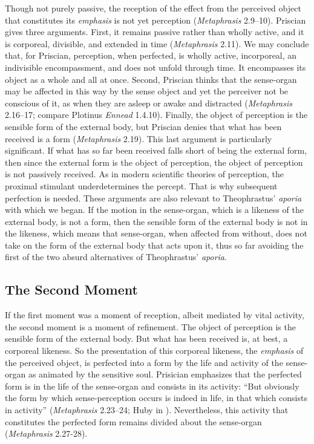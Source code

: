 \documentclass[12pt]{article}
\begin{document}
Though not purely passive, the reception of the effect from the perceived object that constitutes its \emph{emphasis} is not yet perception (\emph{Metaphrasis} 2.9--10). Priscian gives three arguments. First, it remains passive rather than wholly active, and it is corporeal, divisible, and extended in time (\emph{Metaphrasis} 2.11). We may conclude that, for Priscian, perception, when perfected, is wholly active, incorporeal, an indivisible encompassment, and does not unfold through time. It encompasses its object as a whole and all at once. Second, Priscian thinks that the sense-organ may be affected in this way by the sense object and yet the perceiver not be conscious of it, as when they are asleep or awake and distracted (\emph{Metaphrasis} 2.16--17; compare Plotinus \emph{Ennead} 1.4.10). Finally, the object of perception is the sensible form of the external body, but Priscian denies that what has been received is a form (\emph{Metaphrasis} 2.19). This last argument is particularly significant. If what has so far been received falls short of being the external form, then since the external form is the object of perception, the object of perception is not passively received. As in modern scientific theories of perception, the proximal stimulant underdetermines the percept. That is why subsequent perfection is needed. These arguments are also relevant to Theophrastus' \emph{aporia} with which we began. If the motion in the sense-organ, which is a likeness of the external body, is not a form, then the sensible form of the external body is not in the likeness, which means that sense-organ, when affected from without, does not take on the form of the external body that acts upon it, thus so far avoiding the first of the two absurd alternatives of Theophrastus' \emph{aporia}. 


\subsection{The Second Moment} %
\label{sub:the_second_moment}

If the first moment was a moment of reception, albeit mediated by vital activity, the second moment is a moment of refinement. The object of perception is the sensible form of the external body. But what has been received is, at best, a corporeal likeness. So the presentation of this corporeal likeness, the \emph{emphasis} of the perceived object, is perfected into a form by the life and activity of the sense-organ as animated by the sensitive soul. Prisician emphasizes that the perfected form is in the life of the sense-organ and consists in its activity: ``But obviously the form by which sense-perception occurs is indeed in life, in that which consists in activity'' (\emph{Metaphrasis} 2.23--24; Huby in \citealt[10]{Sorabji:1997ly}). Nevertheless, this activity that constitutes the perfected form remains divided about the sense-organ (\emph{Metaphrasis} 2.27-28).
\end{document}
